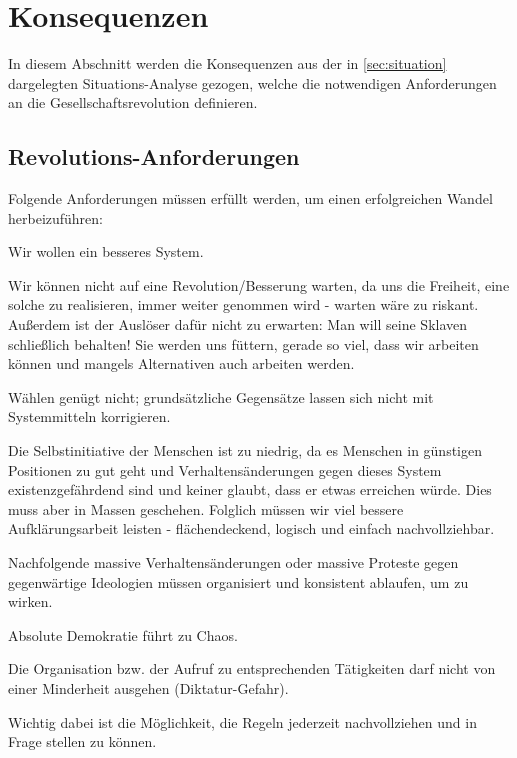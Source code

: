 \section{Konsequenzen}\label{sec:consequences}

In diesem Abschnitt werden die Konsequenzen aus der in \vref{sec:situation} dargelegten Situations-Analyse gezogen, welche die notwendigen Anforderungen an die Gesellschaftsrevolution definieren.

\subsection{Revolutions-Anforderungen}\label{sec:consequences/requirements}

Folgende Anforderungen müssen erfüllt werden, um einen erfolgreichen Wandel herbeizuführen:
\medskip
\begin{compactitem}
\item Wir wollen ein besseres System.
\item Wir können nicht auf eine Revolution/Besserung warten, da uns die Freiheit, eine solche zu realisieren, immer weiter genommen wird - warten wäre zu riskant. Außerdem ist der Auslöser dafür nicht zu erwarten: Man will seine Sklaven schließlich behalten! Sie werden uns füttern, gerade so viel, dass wir arbeiten können und mangels Alternativen auch arbeiten werden.
\item Wählen genügt nicht; grundsätzliche Gegensätze lassen sich nicht mit Systemmitteln korrigieren.
\item Die Selbstinitiative der Menschen ist zu niedrig, da es Menschen in günstigen Positionen zu gut geht und Verhaltensänderungen gegen dieses System existenzgefährdend sind und keiner glaubt, dass er etwas erreichen würde. Dies muss aber in Massen geschehen. Folglich müssen wir viel bessere Aufklärungsarbeit leisten - flächendeckend, logisch und einfach nachvollziehbar.
\item Nachfolgende massive Verhaltensänderungen oder massive Proteste gegen gegenwärtige Ideologien müssen organisiert und konsistent ablaufen, um zu wirken.
\item Absolute Demokratie führt zu Chaos.
\item Die Organisation bzw. der Aufruf zu entsprechenden Tätigkeiten darf nicht von einer Minderheit ausgehen (Diktatur-Gefahr).
\end{compactitem}
\medskip

Wichtig dabei ist die Möglichkeit, die Regeln jederzeit nachvollziehen und in Frage stellen zu können.

